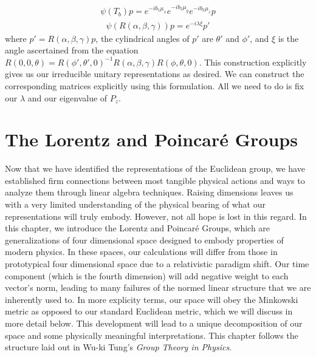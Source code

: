 \documentclass[10pt]{ucthesis}
\begin{document}
\begin{equation}
\begin{aligned}
	\psi(T_b) p = e^{-ib_1\mu_x}e^{-ib_2\mu_y}e^{-ib_3\mu_z}p
\end{aligned}
\end{equation}
\begin{equation}
\begin{aligned}
	\psi(R(\alpha,\beta,\gamma)) p = e^{-i\lambda\xi}p'
\end{aligned}
\end{equation}
where $p' = R(\alpha,\beta,\gamma)p$, the cylindrical angles of $p'$ are $\theta'$ and $\phi'$, and $\xi$ is the angle ascertained from the equation $R(0,0,\theta)=R(\phi',\theta',0)^{-1}R(\alpha,\beta,\gamma) R(\phi,\theta,0)$. This construction explicitly gives us our irreducible unitary representations as desired. We can construct the corresponding matrices explicitly using this formulation. All we need to do is fix our $\lambda$ and our eigenvalue of $P_z$.


\chapter{The Lorentz and Poincar\'e Groups}

Now that we have identified the representations of the Euclidean group, we have established firm connections between most tangible physical actions and ways to analyze them through linear algebra techniques. Raising dimensions leaves us with a very limited understanding of the physical bearing of what our representations will truly embody. However, not all hope is lost in this regard. In this chapter, we introduce the Lorentz and Poincar\'e Groups, which are generalizations of four dimensional space designed to embody properties of modern physics. In these spaces, our calculations will differ from those in prototypical four dimensional space due to a relativistic paradigm shift. Our time component (which is the fourth dimension) will add negative weight to each vector's norm, leading to many failures of the normed linear structure that we are inherently used to. In more explicity terms, our space will obey the Minkowski metric as opposed to our standard Euclidean metric, which we will discuss in more detail below. This development will lead to a unique decomposition of our space and some physically meaningful interpretations. This chapter follows the structure laid out in Wu-ki Tung's \textit{Group Theory in Physics}. \cite{Tung}
\end{document}
